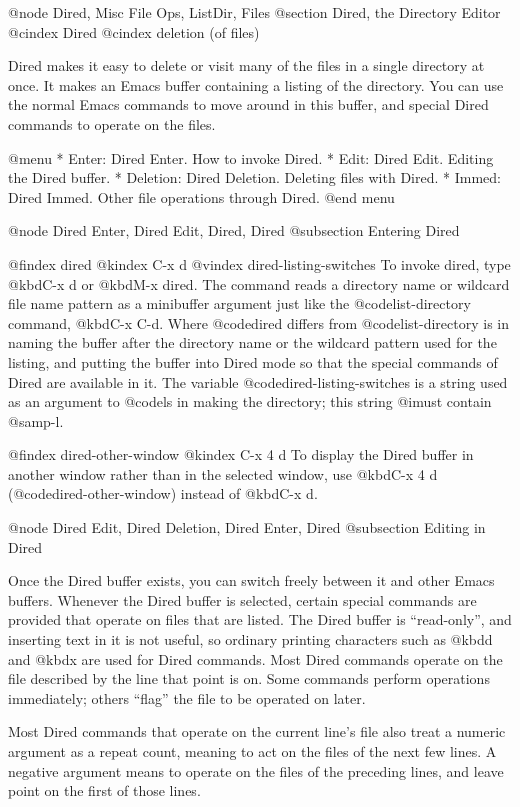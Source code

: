 {{{{{{{{{{{{{{{{{{{@node Dired, Misc File Ops, ListDir, Files
@section Dired, the Directory Editor
@cindex Dired
@cindex deletion (of files)

  Dired makes it easy to delete or visit many of the files in a single
directory at once.  It makes an Emacs buffer containing a listing of the
directory.  You can use the normal Emacs commands to move around in this
buffer, and special Dired commands to operate on the files.

@menu
* Enter: Dired Enter.         How to invoke Dired.
* Edit: Dired Edit.           Editing the Dired buffer.
* Deletion: Dired Deletion.   Deleting files with Dired.
* Immed: Dired Immed.         Other file operations through Dired.
@end menu

@node Dired Enter, Dired Edit, Dired, Dired
@subsection Entering Dired

@findex dired
@kindex C-x d
@vindex dired-listing-switches
  To invoke dired, type @kbd{C-x d} or @kbd{M-x dired}.  The command reads a
directory name or wildcard file name pattern as a minibuffer argument just
like the @code{list-directory} command, @kbd{C-x C-d}.  Where @code{dired}
differs from @code{list-directory} is in naming the buffer after the
directory name or the wildcard pattern used for the listing, and putting
the buffer into Dired mode so that the special commands of Dired are
available in it.  The variable @code{dired-listing-switches} is a string
used as an argument to @code{ls} in making the directory; this string
@i{must} contain @samp{-l}.

@findex dired-other-window
@kindex C-x 4 d
  To display the Dired buffer in another window rather than in the selected
window, use @kbd{C-x 4 d} (@code{dired-other-window)} instead of @kbd{C-x d}.

@node Dired Edit, Dired Deletion, Dired Enter, Dired
@subsection Editing in Dired

  Once the Dired buffer exists, you can switch freely between it and other
Emacs buffers.  Whenever the Dired buffer is selected, certain special
commands are provided that operate on files that are listed.  The Dired
buffer is ``read-only'', and inserting text in it is not useful, so
ordinary printing characters such as @kbd{d} and @kbd{x} are used for Dired
commands.  Most Dired commands operate on the file described by the line
that point is on.  Some commands perform operations immediately; others
``flag'' the file to be operated on later.

  Most Dired commands that operate on the current line's file also treat a
numeric argument as a repeat count, meaning to act on the files of the
next few lines.  A negative argument means to operate on the files of the
preceding lines, and leave point on the first of those lines.

}}}}}}}}}}}}}}}}}}}
